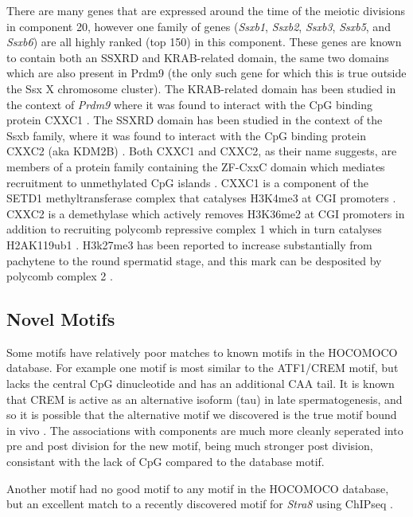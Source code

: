 There are many genes that are expressed around the time of the meiotic divisions in component 20, however one family of genes (\textit{Ssxb1}, \textit{Ssxb2}, \textit{Ssxb3}, \textit{Ssxb5}, and \textit{Ssxb6}) are all highly ranked (top 150) in this component. These genes are known to contain both an SSXRD and KRAB-related domain, the same two domains which are also present in Prdm9 (the only such gene for which this is true outside the Ssx X chromosome cluster). The KRAB-related domain has been studied in the context of \textit{Prdm9} where it was found to interact with the CpG binding protein CXXC1 \parencite{Imai2017PRDM9, Parvanov2017PRDM9}. The SSXRD domain has been studied in the context of the Ssxb family, where it was found to interact with the CpG binding protein CXXC2 (aka KDM2B) \parencite{Banito2018SS18SSX}. Both CXXC1 and CXXC2, as their name suggests, are members of a protein family containing the ZF-CxxC domain which mediates recruitment to unmethylated CpG islands \parencite[reviewed in]{Long2013ZFCxxC}. CXXC1 is a component of the SETD1 methyltransferase complex that catalyses H3K4me3 at CGI promoters \parencite{Lee2005CpGbinding}. CXXC2 is a demethylase which actively removes H3K36me2 at CGI promoters in addition to recruiting polycomb repressive complex 1 which in turn catalyses H2AK119ub1 \parencite{He2008H3K36, Farcas2012KDM2B, He2013Kdm2b, Wu2013Fbxl10}. H3k27me3 has been reported to increase substantially from pachytene to the round spermatid stage, and this mark can be desposited by polycomb complex 2 \parencite{Sin2015Poised}.


  
\subsection{Novel Motifs}

Some motifs have relatively poor matches to known motifs in the HOCOMOCO database. For example one motif is most similar to the ATF1/CREM motif, but lacks the central CpG dinucleotide and has an additional CAA tail. It is known that CREM is active as an alternative isoform (tau) in late spermatogenesis, and so it is possible that the alternative motif we discovered is the true motif bound in vivo \parencite{Sassone-Corsi2000CREM}. The associations with components are much more cleanly seperated into pre and post division for the new motif, being much stronger post division, consistant with the lack of CpG compared to the database motif.

Another motif had no good motif to any motif in the HOCOMOCO database, but an excellent match to a recently discovered motif for \textit{Stra8} using ChIPseq \parencite{Kojima2019Amplification}.




